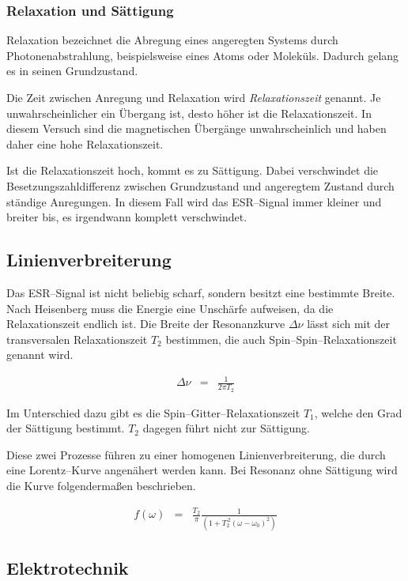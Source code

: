 \documentclass[12pt,a4paper]{scrartcl}
\numberwithin{equation}{section} %
\begin{document}
\subsubsection{Relaxation und Sättigung}
Relaxation bezeichnet die Abregung eines angeregten Systems durch Photonenabstrahlung, beispielsweise eines Atoms oder Moleküls. Dadurch gelang es in seinen Grundzustand.

Die Zeit zwischen Anregung und Relaxation wird \emph{Relaxationszeit} genannt. Je unwahrscheinlicher ein Übergang ist, desto höher ist die Relaxationszeit. In diesem Versuch sind die magnetischen Übergänge unwahrscheinlich und haben daher eine hohe Relaxationszeit.

Ist die Relaxationszeit hoch, kommt es zu Sättigung. Dabei verschwindet die Besetzungszahldifferenz zwischen Grundzustand und angeregtem Zustand durch ständige Anregungen. \cite{Oldenburg} In diesem Fall wird das ESR--Signal immer kleiner und breiter bis, es irgendwann komplett verschwindet.

\subsection{Linienverbreiterung}
Das ESR--Signal ist nicht beliebig scharf, sondern besitzt eine bestimmte Breite. Nach Heisenberg muss die Energie eine Unschärfe aufweisen, da die Relaxationszeit endlich ist. Die Breite der Resonanzkurve $\Delta \nu $ lässt sich mit der transversalen Relaxationszeit $T_2$ bestimmen, die auch Spin--Spin--Relaxationszeit genannt wird.

\begin{eqnarray}
	\Delta \nu &=& \frac{1}{2 \pi T_2}
\end{eqnarray}

\noindent
Im Unterschied dazu gibt es die Spin--Gitter--Relaxationszeit $T_1$, welche den Grad der Sättigung bestimmt. $T_2$ dagegen führt nicht zur Sättigung.

Diese zwei Prozesse führen zu einer homogenen Linienverbreiterung, die durch eine Lorentz--Kurve angenähert werden kann. Bei Resonanz ohne Sättigung wird die Kurve folgendermaßen beschrieben. \cite{Bern}

\begin{eqnarray}
	f(\omega) &=& \frac{T_2}{\pi}\frac{1}{(1+T_2^{\,2} (\omega - \omega _0)^2)}
\end{eqnarray}

\hypertarget{elektrotechnik}{%
\subsection{Elektrotechnik}\label{elektrotechnik}}
\end{document}
